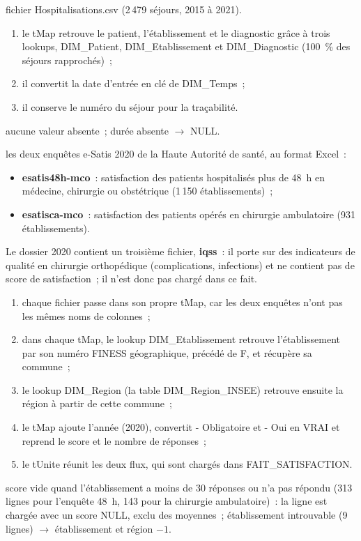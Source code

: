   {fichier Hospitalisations.csv (2\,479 séjours, 2015 à 2021).}
  {
  \begin{enumerate}
	\item le tMap retrouve le patient, l'établissement et le diagnostic grâce à trois lookups, DIM\_Patient, DIM\_Etablissement et DIM\_Diagnostic (100~\% des séjours rapprochés)~;
	\item il convertit la date d'entrée en clé de DIM\_Temps~;
	\item il conserve le numéro du séjour pour la traçabilité.
  \end{enumerate}}
  {aucune valeur absente~; durée absente $\rightarrow$ NULL.}

  {les deux enquêtes e-Satis 2020 de la Haute Autorité de santé, au format Excel~:
  \begin{itemize}
	\item \textbf{esatis48h-mco}~: satisfaction des patients hospitalisés plus de 48~h en médecine, chirurgie ou obstétrique (1\,150 établissements)~;
	\item \textbf{esatisca-mco}~: satisfaction des patients opérés en chirurgie ambulatoire (931 établissements).
  \end{itemize}
  \vspace{0.1cm}\noindent Le dossier 2020 contient un troisième fichier, \textbf{iqss}~: il porte sur des indicateurs de qualité en chirurgie orthopédique (complications, infections) et ne contient pas de score de satisfaction~; il n'est donc pas chargé dans ce fait.}
  {
  \begin{enumerate}
	\item chaque fichier passe dans son propre tMap, car les deux enquêtes n'ont pas les mêmes noms de colonnes~;
	\item dans chaque tMap, le lookup DIM\_Etablissement retrouve l'établissement par son numéro FINESS géographique, précédé de \og F\fg{}, et récupère sa commune~;
	\item le lookup DIM\_Region (la table DIM\_Region\_INSEE) retrouve ensuite la région à partir de cette commune~;
	\item le tMap ajoute l'année (2020), convertit - Obligatoire\fg{} et - Oui\fg{} en VRAI et reprend le score et le nombre de réponses~;
	\item le tUnite réunit les deux flux, qui sont chargés dans FAIT\_SATISFACTION.
  \end{enumerate}}
  {score vide quand l'établissement a moins de 30 réponses ou n'a pas répondu (313 lignes pour l'enquête 48~h, 143 pour la chirurgie ambulatoire)~: la ligne est chargée avec un score NULL, exclu des moyennes~; établissement introuvable (9 lignes) $\rightarrow$ établissement et région $-1$.}

